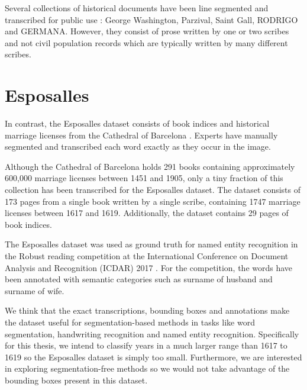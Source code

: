 Several collections of historical documents have been line segmented and transcribed for public use \cite{esposalles}: George Washington, Parzival, Saint Gall, RODRIGO and GERMANA. However, they consist of prose written by one or two scribes and not civil population records which are typically written by many different scribes.

\section{Esposalles}
In contrast, the Esposalles dataset consists of book indices and historical marriage licenses from the Cathedral of Barcelona \cite{esposalles}. Experts have manually segmented and transcribed each word exactly as they occur in the image.

Although the Cathedral of Barcelona holds 291 books containing approximately 600,000 marriage licenses between 1451 and 1905, only a tiny fraction of this collection has been transcribed for the Esposalles dataset. The dataset consists of 173 pages from a single book written by a single scribe, containing 1747 marriage licenses between 1617 and 1619. Additionally, the dataset contains 29 pages of book indices.

The Esposalles dataset was used as ground truth for named entity recognition in the Robust reading competition at the International Conference on Document Analysis and Recognition (ICDAR) 2017 \cite{EsposallesCompetition}. For the competition, the words have been annotated with semantic categories such as surname of husband and surname of wife.

We think that the exact transcriptions, bounding boxes and annotations make the dataset useful for segmentation-based methods in tasks like word segmentation, handwriting recognition and named entity recognition.
Specifically for this thesis, we intend to classify years in a much larger range than 1617 to 1619 so the Esposalles dataset is simply too small. Furthermore, we are interested in exploring segmentation-free methods so we would not take advantage of the bounding boxes present in this dataset.




